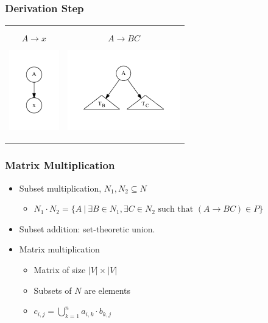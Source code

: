 \documentclass[xcolor=table]{beamer}
\begin{document}
\begin{frame}[fragile]
  \transwipe[direction=90]
  \frametitle{Derivation Step}

  \begin{tabular}{p{4cm} | p{6cm} }
      $$ A \rightarrow x $$    

   \begin{center}
      \includegraphics[height=3.5cm]{pictures/tree1.pdf}
    \end{center}

    &
      $$ A \rightarrow B C $$  

    \begin{center}   
      \includegraphics[height=3.5cm]{pictures/tree2.pdf}
    \end{center} 
  \end{tabular}

\end{frame}
  
\begin{frame}
  \transwipe[direction=90]
  \frametitle{Matrix Multiplication}
  \begin{itemize}
    \item Subset multiplication, $N_1, N_2 \subseteq N$
    \begin{itemize} 
      \item $N_1 \cdot N_2 = \{A~|~\exists B \in N_1, \exists C \in N_2 \text{ such that }(A \rightarrow B C) \in P\}$
    \end{itemize}
    \item Subset addition: set-theoretic union.
  \end{itemize}

  \begin{itemize}
    \item Matrix multiplication
    \begin{itemize}
      \item Matrix of size $|V| \times |V|$
      \item Subsets of $N$ are elements
      \item $c_{i,j} = \bigcup^{n}_{k=1}{a_{i,k} \cdot b_{k,j}}$
    \end{itemize}
  \end{itemize}
\end{frame}
\end{document}
